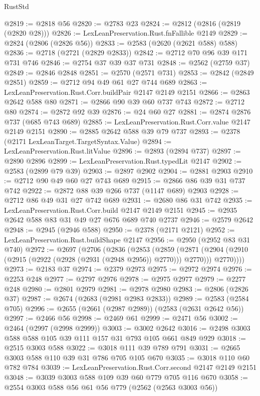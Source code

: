 \begin{lexlean}{RustStd}
\begin{coremodule}
@2819 := @2818 @56
@2820 := @2783 @23
@2824 := @2812 (@2816 (@2819 (@2820 @28)))
@2826 := LexLeanPreservation.Rust.fnFallible @2149
@2829 := @2824 (@2806 (@2826 @56))
@2833 := @2583 (@2620 (@2621 @588) @588)
@2836 := @2718 (@2721 (@2829 @2833))
@2842 := @2712 @70 @96 @39 @171 @731 @746
@2846 := @2754 @37 @39 @37 @731
@2848 := @2562 (@2759 @37)
@2849 := @2846 @2848
@2851 := @2570 (@2571 @731)
@2853 := @2842 (@2849 @2851)
@2859 := @2712 @94 @49 @61 @27 @744 @689
@2863 := LexLeanPreservation.Rust.Corr.buildPair @2147 @2149 @2151
@2866 := @2863 @2642 @588 @80
@2871 := @2866 @90 @39 @60 @737 @743
@2872 := @2712 @80
@2874 := @2872 @92 @39
@2876 := @24 @60 @27
@2881 := @2874 @2876 @737 (@685 @743 @689)
@2885 := LexLeanPreservation.Rust.Corr.value @2147 @2149 @2151
@2890 := @2885 @2642 @588 @39 @79 @737
@2893 := @2378 (@2171 LexLeanTarget.TargetSyntax.Value)
@2894 := LexLeanPreservation.Rust.litValue
@2896 := @2893 (@2894 @737)
@2897 := @2890 @2896
@2899 := LexLeanPreservation.Rust.typedLit @2147
@2902 := @2583 (@2899 @79 @39)
@2903 := @2897 @2902
@2904 := @2881 @2903
@2910 := @2712 @90 @49 @60 @27 @743 @689
@2915 := @2866 @86 @39 @31 @737 @742
@2922 := @2872 @88 @39 @266 @737 (@1147 @689) @2903
@2928 := @2712 @86 @49 @31 @27 @742 @689
@2931 := @2680 @86 @31 @742
@2935 := LexLeanPreservation.Rust.Corr.build @2147 @2149 @2151
@2945 := @2935 @2642 @588 @83 @31 @49 @27 @676 @689 @740 @2737
@2946 := @2579 @2642
@2948 := @2945 (@2946 @588)
@2950 := @2378 (@2171 @2121)
@2952 := LexLeanPreservation.Rust.buildShape @2147
@2956 := @2950 (@2952 @83 @31 @740)
@2972 := @2697
    (@2706
      (@2836
        (@2853
          (@2859
            (@2871 (@2904 (@2910 (@2915 (@2922 (@2928 (@2931 (@2948 @2956)) @2770))) @2770)))
            @2770))))
@2973 := @2183 @37
@2974 := @2379 @2973
@2975 := @2972 @2974
@2976 := @2253 @248
@2977 := @2797 @2976
@2978 := @2975 @2977
@2979 := @2277 @248
@2980 := @2801 @2979
@2981 := @2978 @2980
@2983 := @2806 (@2826 @37)
@2987 := @2674 (@2683 (@2981 @2983 @2833))
@2989 := @2583 (@2584 @705)
@2996 := @2655 (@2661 (@2987 @2989)) (@2583 (@2631 @2642 @56))
@2997 := @2466 @56
@2998 := @2469 @61
@2999 := @2471 @56
@3002 := @2464 (@2997 (@2998 @2999))
@3003 := @3002 @2642
@3016 := @2498 @3003 @588 @588 @105 @39 @111 @157 @31 @793 @105 @661 @849 @929
@3018 := @2515 @3003 @588
@3022 := @3018 @111 @39 @789 @791
@3031 := @2665 @3003 @588 @110 @39 @31 @786 @705 @105 @670
@3035 := @3018 @110 @60 @782 @784
@3039 := LexLeanPreservation.Rust.Corr.second @2147 @2149 @2151
@3048 := @3039 @3003 @588 @109 @39 @60 @779 @705 @116 @670
@3058 := @2554 @3003 @588 @56 @61 @56 @779 (@2562 (@2563 @3003 @56))

\end{coremodule}
\end{lexlean}
